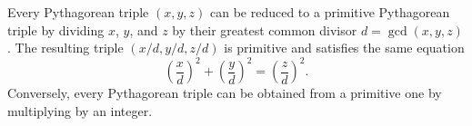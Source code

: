 Every Pythagorean triple $(x, y, z)$ can be reduced to a primitive Pythagorean triple by dividing $x$, $y$, and $z$ by their greatest common divisor $d = \gcd(x, y, z)$. The resulting triple $(x/d, y/d, z/d)$ is primitive and satisfies the same equation
$$\left(\frac{x}{d}\right)^2 + \left(\frac{y}{d}\right)^2 = \left(\frac{z}{d}\right)^2.$$
Conversely, every Pythagorean triple can be obtained from a primitive one by multiplying by an integer.
